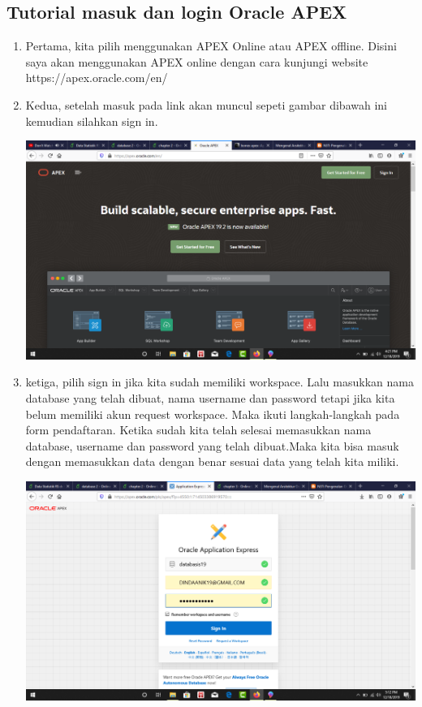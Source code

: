 \subsection{Tutorial masuk dan login Oracle APEX}
\begin{enumerate}
    \item Pertama, kita pilih menggunakan APEX Online atau APEX offline. Disini saya akan menggunakan APEX online dengan cara kunjungi website https://apex.oracle.com/en/
    \item Kedua, setelah masuk pada link akan muncul sepeti gambar dibawah ini kemudian silahkan sign in.
 \begin{center}
    \includegraphics[width=10cm\textwidth]{gambar/1.png}
\end{center}
\newpage
    \item ketiga, pilih sign in jika kita sudah memiliki workspace. Lalu masukkan nama database yang telah dibuat, nama username dan password tetapi jika kita belum memiliki akun request workspace. Maka  ikuti langkah-langkah pada  form pendaftaran.  Ketika sudah kita telah selesai memasukkan nama database, username dan password yang telah dibuat.Maka kita bisa masuk dengan memasukkan data dengan benar sesuai data yang telah kita miliki.
    \begin{center}
    \includegraphics[width=10cm\textwidth]{gambar/2.png}
    \end{center}
\end{enumerate}

